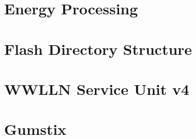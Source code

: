 
\section{Energy Processing}

\section{Flash Directory Structure}

\section{WWLLN Service Unit v4}

\section{Gumstix}

